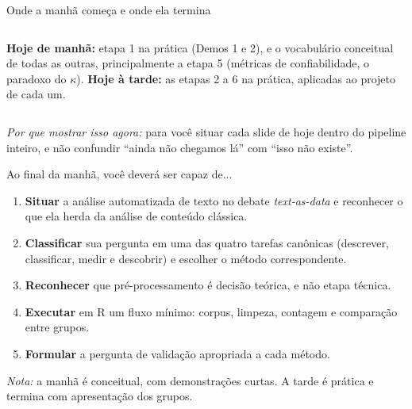 \documentclass[11pt,aspectratio=169]{beamer}
\begin{document}
\begin{frame}{Onde a manhã começa e onde ela termina}
\centering
{}
\vspace{0.45cm}

\begin{columns}[T]
\small \textbf{Hoje de manhã:} etapa 1 na prática (Demos 1 e 2), e o
vocabulário conceitual de todas as outras, principalmente a etapa 5
(métricas de confiabilidade, o paradoxo do $\kappa$).
\small \textbf{Hoje à tarde:} as etapas 2 a 6 na prática, aplicadas ao
projeto de cada um.
\end{columns}
\vspace{0.2cm}
\footnotesize \textit{Por que mostrar isso agora:} para você situar cada
slide de hoje dentro do pipeline inteiro, e não confundir ``ainda não
chegamos lá'' com ``isso não existe''.
\end{frame}

\begin{frame}{Ao final da manhã, você deverá ser capaz de...}
\begin{enumerate}
  \item \textbf{Situar} a análise automatizada de texto no debate
        \emph{text-as-data} e reconhecer o que ela herda da análise de conteúdo
        clássica.
  \item \textbf{Classificar} sua pergunta em uma das quatro tarefas canônicas
        (descrever, classificar, medir e descobrir) e escolher o método
        correspondente.
  \item \textbf{Reconhecer} que pré-processamento é decisão teórica, e não etapa
        técnica.
  \item \textbf{Executar} em R um fluxo mínimo: corpus, limpeza, contagem e
        comparação entre grupos.
  \item \textbf{Formular} a pergunta de validação apropriada a cada método.
\end{enumerate}
\vspace{0.25cm}
\small \textit{Nota:} a manhã é conceitual, com demonstrações curtas. A tarde é
prática e termina com apresentação dos grupos.
\end{frame}
\end{document}
